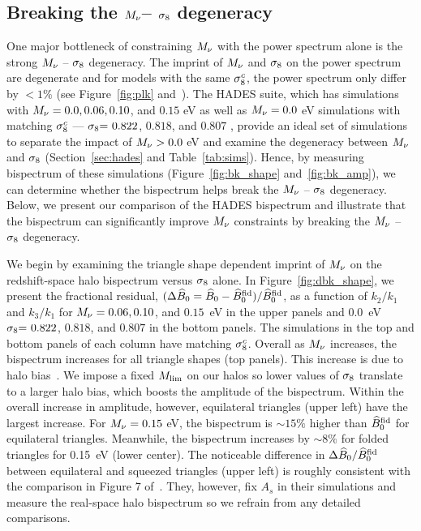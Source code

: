 \subsection{Breaking the $M_\nu$-- $\sigma_8$ degeneracy} \label{sec:mnusig}
One major bottleneck of constraining $M_\nu$ with the power spectrum alone is the 
strong $M_\nu$ -- $\sigma_8$ degeneracy. The imprint of $M_\nu$ and $\sigma_8$ on the power 
spectrum are degenerate and for models with the same $\sigma_8^c$, the power spectrum
only differ by $< 1\%$ (see Figure~\ref{fig:plk} and~\citealt{villaescusa-navarro2018}). 
The HADES suite, which has simulations with $M_\nu = 0.0, 0.06, 0.10$, 
and $0.15$ eV as well as $M_\nu = 0.0$ eV simulations with matching $\sigma_8^{c}$ --- 
$\sigma_8{=}~0.822$, $0.818$, and $0.807$ , provide an ideal set of simulations to 
separate the impact of $M_\nu > 0.0$ eV and examine the degeneracy between 
$M_\nu$ and $\sigma_8$ (Section~\ref{sec:hades} and Table~\ref{tab:sims}). Hence, by 
measuring bispectrum of these simulations (Figure~\ref{fig:bk_shape} and~\ref{fig:bk_amp}), 
we can determine whether the bispectrum helps break the $M_\nu$ -- $\sigma_8$ 
degeneracy. Below, we present our comparison of the HADES bispectrum and 
illustrate that the bispectrum can significantly improve $M_\nu$ constraints 
by breaking the $M_\nu$ -- $\sigma_8$ degeneracy. 

We begin by examining the triangle shape dependent imprint of $M_\nu$ on the 
redshift-space halo bispectrum versus $\sigma_8$ alone. In Figure~\ref{fig:dbk_shape}, 
we present the fractional residual, $(\Delta \widehat{B}_0 = \widehat{B}_0 - \widehat{B}_0^{\rm fid})/\widehat{B}_0^{\rm fid}$,
as a function of $k_2/k_1$ and $k_3/k_1$ for $M_\nu=0.06, 0.10$, and $0.15$~eV 
in the upper panels and 0.0~eV $\sigma_8{=}~0.822$, $0.818$, and $0.807$ in the 
bottom panels. The simulations in the top and bottom panels of each column 
have matching $\sigma_8^{c}$. Overall as $M_\nu$ increases, the bispectrum increases 
for all triangle shapes (top panels). This increase is due to halo 
bias~\citep[][; see also Figure~\ref{fig:plk}]{villaescusa-navarro2018}. We 
impose a fixed $M_{\rm lim}$ on our halos so lower values of $\sigma_8$ translate 
to a larger halo bias, which boosts the amplitude of the bispectrum. Within the 
overall increase in amplitude, however, equilateral triangles (upper left) have 
the largest increase. For $M_\nu=0.15$ eV, the bispectrum is $\sim 15\%$ higher 
than $\widehat{B}_0^{\rm fid}$ for equilateral triangles. Meanwhile, the bispectrum increases 
by $\sim 8\%$ for folded triangles for 0.15~eV (lower center). The noticeable 
difference in $\Delta \widehat{B}_0/\widehat{B}_0^{\rm fid}$ between equilateral and squeezed 
triangles (upper left) is roughly consistent with the comparison in Figure 7 
of~\cite{ruggeri2018}. They, however, fix $A_s$ in their simulations and 
measure the real-space halo bispectrum so we refrain from any detailed 
comparisons. 


